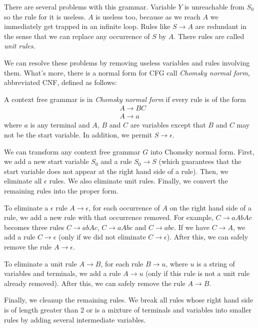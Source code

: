 \documentclass[11pt]{article}
\begin{document}
There are several problems with this grammar. Variable $Y$ is unreachable from $S_0$ so
the rule for it is useless. $A$ is useless too, because as we reach $A$ we immediately get trapped
in an infinite loop. Rules like $S \rightarrow A$ are redundant in the sense that we can replace
any occurrence of $S$ by $A$. There rules are called \emph{unit rules}.

We can resolve these problems by removing useless variables and rules involving them. What's more,
there is a normal form for CFG call \emph{Chomsky normal form}, abbreviated CNF, defined as
follows:

\begin{definition}
A context free grammar is in \emph{Chomsky normal form} if every rule is of the form
\begin{align*}
&A \rightarrow BC \\
&A \rightarrow a
\end{align*}
where $a$ is any terminal and $A$, $B$ and $C$ are variables except that $B$ and $C$ may not be
the start variable. In addition, we permit $S \rightarrow \epsilon$.
\end{definition}

We can transform any context free grammar $G$ into Chomsky normal form. First, we add a new start
variable $S_0$ and a rule $S_0 \rightarrow S$ (which guarantees that the start variable does not
appear at the right hand side of a rule). Then, we eliminate all $\epsilon$ rules. We also
eliminate unit rules. Finally, we convert the remaining rules into the proper form.

To eliminate a $\epsilon$ rule $A \rightarrow \epsilon$, for each occurrence of $A$ on the right
hand side of a rule, we add a new rule with that occurrence removed. For example, $C \rightarrow
aAbAc$ becomes three rules $C \rightarrow abAc$, $C \rightarrow aAbc$ and $C \rightarrow abc$. If
we have $C \rightarrow A$, we add a rule $C \rightarrow \epsilon$ (only if we did not eliminate
$C \rightarrow \epsilon$). After this, we can safely remove the rule $A \rightarrow \epsilon$.

To eliminate a unit rule $A \rightarrow B$, for each rule $B \rightarrow u$, where $u$ is a string
of variables and terminals, we add a rule $A \rightarrow u$ (only if this rule is not a unit rule
already removed). After this, we can safely remove the rule $A \rightarrow B$.

Finally, we cleanup the remaining rules. We break all rules whose right hand side is of length
greater than 2 or is a mixture of terminals and variables into smaller rules by adding several
intermediate variables.
\end{document}
